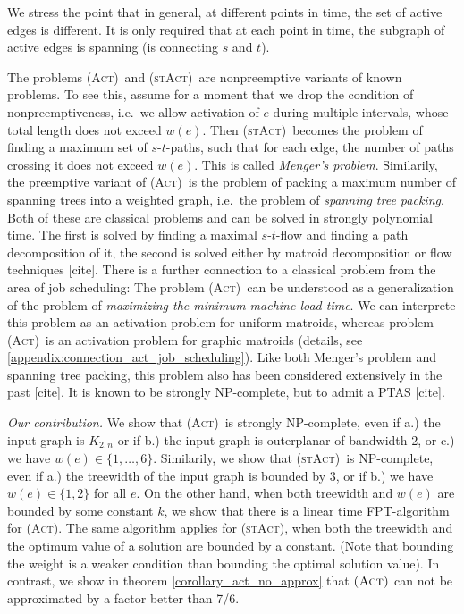 \documentclass[10pt,a4paper]{article}
\numberwithin{equation}{section}
\newcommand{\set}[1]{\{ #1 \}}
\newcommand{\fromto}[2]{\set{#1, \ldots, #2}}
\newcommand{\act}{\textsc{(Act)}}
\newcommand{\stact}{\textsc{(stAct)}}
\begin{document}
We stress the point that in general, at different points in time, the set of active edges is different. It is only required that at each point in time, the subgraph of active edges is spanning (is connecting $s$ and $t$). 

The problems \act\ and \stact\ are nonpreemptive variants of known problems. To see this, assume for a moment that we drop the condition of nonpreemptiveness, i.e.\ we allow activation of $e$ during multiple intervals, whose total length does not exceed $w(e)$. Then \stact\ becomes the problem of finding a maximum set of $s$-$t$-paths, such that for each edge, the number of paths crossing it does not exceed $w(e)$. This is called \emph{Menger's problem}. Similarily, the preemptive variant of \act\ is the problem of packing a maximum number of spanning trees into a weighted graph, i.e.\ the problem of \emph{spanning tree packing}. Both of these are classical problems and can be solved in strongly polynomial time. The first is solved by finding a maximal $s$-$t$-flow and finding a path decomposition of it, the second is solved either by matroid decomposition or flow techniques [cite]. There is a further connection to a classical problem from the area of job scheduling: The problem \act\ can be understood as a generalization of the problem of \emph{maximizing the minimum machine load time}. We can interprete this problem as an activation problem for uniform matroids, whereas problem \act\ is an activation problem for graphic matroids (details, see \cref{appendix:connection_act_job_scheduling}). Like both Menger's problem and spanning tree packing, this problem also has been considered extensively in the past [cite]. It is known to be strongly NP-complete, but to admit a PTAS [cite].

\emph{Our contribution.}
We show that \act\ is strongly NP-complete, even if a.) the input graph is $K_{2,n}$ or if b.) the input graph is outerplanar of bandwidth 2, or c.) we have $w(e) \in \fromto{1}{6}$. Similarily, we show that \stact\ is NP-complete, even if a.) the treewidth of the input graph is bounded by 3, or if b.) we have $w(e) \in \set{1,2}$ for all $e$. On the other hand, when both treewidth and $w(e)$ are bounded by some constant $k$, we show that there is a linear time FPT-algorithm for \act. The same algorithm applies for \stact, when both the treewidth and the optimum value of a solution are bounded by a constant. (Note that bounding the weight is a weaker condition than bounding the optimal solution value).
In contrast, we show in theorem \cref{corollary_act_no_approx} that $\act$ can not be approximated by a factor better than 7/6.
\end{document}
